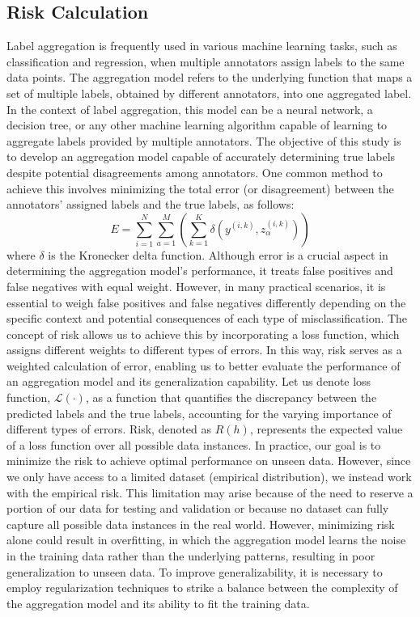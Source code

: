 \subsection{Risk Calculation}
Label aggregation is frequently used in various machine learning tasks, such as classification and regression, when multiple annotators assign labels to the same data points. The aggregation model refers to the underlying function that maps a set of multiple labels, obtained by different annotators, into one aggregated label. In the context of label aggregation, this model can be a neural network, a decision tree, or any other machine learning algorithm capable of learning to aggregate labels provided by multiple annotators. The objective of this study is to develop an aggregation model capable of accurately determining true labels despite potential disagreements among annotators. One common method to achieve this involves minimizing the total error (or disagreement) between the annotators' assigned labels and the true labels, as follows:
\begin{equation}
E = \sum_{i=1}^N \sum_{a=1}^M \left( \sum_{k=1}^K \delta\left(y^{(i,k)}, z_\alpha^{(i,k)}\right) \right)
\label{eq:crowd.Eq.1.risk.error}
\end{equation}
where $\delta $ is the Kronecker delta function.
Although error is a crucial aspect in determining the aggregation model's performance, it treats false positives and false negatives with equal weight. However, in many practical scenarios, it is essential to weigh false positives and false negatives differently depending on the specific context and potential consequences of each type of misclassification. The concept of risk allows us to achieve this by incorporating a loss function, which assigns different weights to different types of errors. In this way, risk serves as a weighted calculation of error, enabling us to better evaluate the performance of an aggregation model and its generalization capability.
Let us denote loss function, $\mathcal{L}(\cdot)$, as a function that quantifies the discrepancy between the predicted labels and the true labels, accounting for the varying importance of different types of errors.
Risk, denoted as $R(h) $, represents the expected value of a loss function over all possible data instances.  In practice, our goal is to minimize the risk to achieve optimal performance on unseen data. However, since we only have access to a limited dataset (empirical distribution), we instead work with the empirical risk. This limitation may arise because of the need to reserve a portion of our data for testing and validation or because no dataset can fully capture all possible data instances in the real world. However, minimizing risk alone could result in overfitting, in which the aggregation model learns the noise in the training data rather than the underlying patterns, resulting in poor generalization to unseen data. To improve generalizability, it is necessary to employ regularization techniques to strike a balance between the complexity of the aggregation model and its ability to fit the training data.
